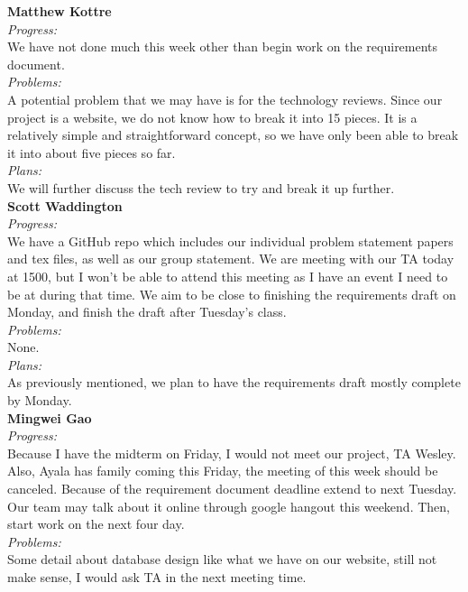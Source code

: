 \noindent\textbf{Matthew Kottre}\\
\noindent\textit{Progress:}\\
We have not done much this week other than begin work on the requirements document.\\

\noindent\textit{Problems:}\\
\noindent A potential problem that we may have is for the technology reviews. Since our project is a website, we do not know how to break it into 15 pieces. It is a relatively simple and straightforward concept, so we have only been able to break it into about five pieces so far.\\

\noindent\textit{Plans:}\\
\noindent We will further discuss the tech review to try and break it up further.\\

\noindent\textbf{Scott Waddington}\\
\noindent\textit{Progress:}\\
We have a GitHub repo which includes our individual problem statement papers and tex files, as well as our group statement. We are meeting with our TA today at 1500, but I won't be able to attend this meeting as I have an event I need to be at during that time. We aim to be close to finishing the requirements draft on Monday, and finish the draft after Tuesday's class.\\

\noindent\textit{Problems:}\\
\noindent None.\\

\noindent\textit{Plans:}\\
\noindent As previously mentioned, we plan to have the requirements draft mostly complete by Monday.\\

\noindent\textbf{Mingwei Gao}\\
\noindent\textit{Progress:}\\
 Because I have the midterm on Friday, I would not meet our project, TA Wesley. Also, Ayala has family coming this Friday, the meeting of this week should be canceled. Because of the requirement document deadline extend to next Tuesday. Our team may talk about it online through google hangout this weekend. Then, start work on the next four day.\\

\noindent\textit{Problems:}\\
\noindent Some detail about database design like what we have on our website, still not make sense, I would ask TA in the next meeting time.\\

